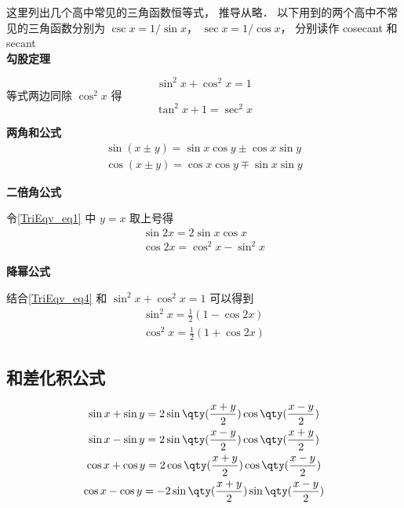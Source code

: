 

这里列出几个高中常见的三角函数恒等式， 推导从略． 以下用到的两个高中不常见的三角函数分别为 $\csc x= 1/\sin x$， $\sec x = 1/\cos x$， 分别读作 cosecant 和 secant\\

\noindent\textbf{勾股定理}

\begin{equation}
\sin^2 x + \cos^2 x = 1
\end{equation}
等式两边同除 $\cos^2 x$ 得
\begin{equation}\label{TriEqv_eq13}
\tan^2 x + 1 = \sec^2 x
\end{equation}

\noindent\textbf{两角和公式}
\begin{gather}\label{TriEqv_eq1}
\sin(x\pm y) = \sin x\cos y \pm \cos x\sin y\\
\cos(x\pm y) = \cos x\cos y \mp \sin x\sin y
\end{gather}

\noindent\textbf{二倍角公式}

令\autoref{TriEqv_eq1} 中 $y=x$ 取上号得
\begin{gather}
\sin 2x = 2\sin x\cos x\\
 \cos 2x = \cos^2 x - \sin^2 x \label{TriEqv_eq4}
\end{gather}

\noindent\textbf{降幂公式}

结合\autoref{TriEqv_eq4} 和 $\sin^2 x + \cos^2 x = 1$ 可以得到
\begin{gather}
\sin^2 x = \frac 12 (1- \cos 2x) \label{TriEqv_eq5} \\
\cos^2 x = \frac 12 (1+\cos 2x) \label{TriEqv_eq6}
\end{gather}

\subsection{和差化积公式}

\begin{gather}
\sin x + \sin y = 2\sin\qty(\frac{x + y}{2})\cos\qty(\frac{x - y}{2})\label{TriEqv_eq7}\\
\sin x - \sin y = 2\sin\qty(\frac{x - y}{2})\cos\qty(\frac{x + y}{2})\label{TriEqv_eq8}\\
\cos x + \cos y = 2\cos\qty(\frac{x+y}{2})\cos\qty(\frac{x-y}{2})\label{TriEqv_eq9}\\
\cos x - \cos y = -2\sin\qty(\frac{x+y}{2})\sin\qty(\frac{x-y}{2})\label{TriEqv_eq10}
\end{gather}


